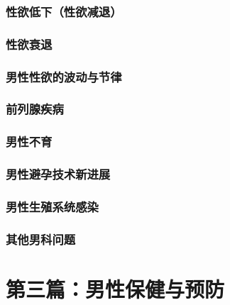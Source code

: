 \section{性欲低下（性欲减退）}

\section{性欲衰退}

\section{男性性欲的波动与节律}

\section{前列腺疾病}

\section{男性不育}

\section{男性避孕技术新进展}

\section{男性生殖系统感染}

\section{其他男科问题}

\part*{第三篇：男性保健与预防}

